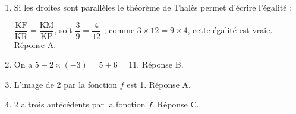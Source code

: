 
\medskip

%
%
% 
%
%
\begin{enumerate}
\item 

Si les droites sont parallèles le théorème de Thalès permet d'écrire l'égalité :

$\dfrac{\text{KF}}{\text{KR}} = \dfrac{\text{KM}}{\text{KP}}$, soit $\dfrac{3}{9} = \dfrac{4}{12}$ ; comme $3 \times 12 = 9 \times 4$, cette égalité est vraie. Réponse A.
\item On a $5 - 2\times (- 3) = 5 + 6 = 11$. Réponse B.
\item L'image de 2 par la fonction $f$ est 1. Réponse A.
\item 2 a trois antécédents par la fonction $f$. Réponse C.
\end{enumerate}
\vspace{0,5cm}

